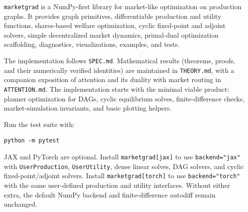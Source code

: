 \texttt{marketgrad} is a NumPy-first library for market-like optimization on production graphs. It provides graph primitives, differentiable production and utility functions, shares-based welfare optimization, cyclic fixed-point and adjoint solvers, simple decentralized market dynamics, primal-dual optimization scaffolding, diagnostics, visualizations, examples, and tests.

The implementation follows \texttt{SPEC.md}. Mathematical results (theorems, proofs, and their numerically verified identities) are maintained in \texttt{THEORY.md}, with a companion exposition of attention and its duality with market routing in \texttt{ATTENTION.md}. The implementation starts with the minimal viable product: planner optimization for DAGs, cyclic equilibrium solves, finite-difference checks, market-simulation invariants, and basic plotting helpers.

Run the test suite with:

\begin{verbatim}
python -m pytest
\end{verbatim}

JAX and PyTorch are optional. Install \texttt{marketgrad{[}jax{]}} to use \texttt{backend="jax"} with \texttt{UserProduction}, \texttt{UserUtility}, dense linear solves, DAG solvers, and cyclic fixed-point/adjoint solvers. Install \texttt{marketgrad{[}torch{]}} to use \texttt{backend="torch"} with the same user-defined production and utility interfaces. Without either extra, the default NumPy backend and finite-difference autodiff remain unchanged.
